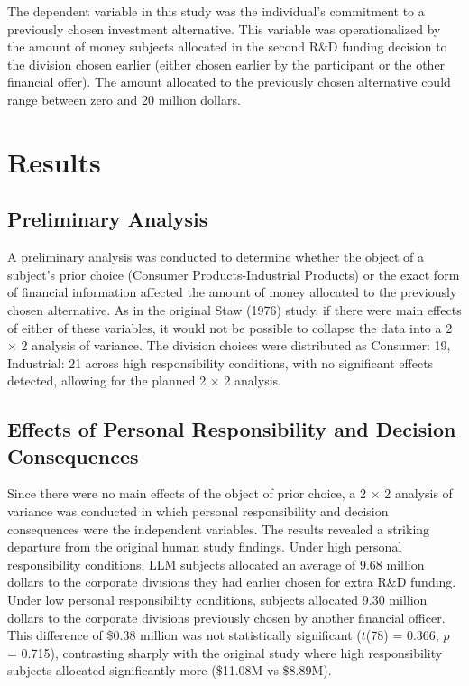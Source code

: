 \documentclass{article}
\begin{document}
The dependent variable in this study was the individual's commitment to a previously chosen investment alternative. This variable was operationalized by the amount of money subjects allocated in the second R\&D funding decision to the division chosen earlier (either chosen earlier by the participant or the other financial offer). The amount allocated to the previously chosen alternative could range between zero and 20 million dollars.

\newpage

\section{Results}

\subsection{Preliminary Analysis}

A preliminary analysis was conducted to determine whether the object of a subject's prior choice (Consumer Products-Industrial Products) or the exact form of financial information affected the amount of money allocated to the previously chosen alternative. As in the original Staw (1976) study, if there were main effects of either of these variables, it would not be possible to collapse the data into a 2 $\times$ 2 analysis of variance. The division choices were distributed as Consumer: 19, Industrial: 21 across high responsibility conditions, with no significant effects detected, allowing for the planned 2 $\times$ 2 analysis.

\subsection{Effects of Personal Responsibility and Decision Consequences}

Since there were no main effects of the object of prior choice, a 2 $\times$ 2 analysis of variance was conducted in which personal responsibility and decision consequences were the independent variables. The results revealed a striking departure from the original human study findings. Under high personal responsibility conditions, LLM subjects allocated an average of 9.68 million dollars to the corporate divisions they had earlier chosen for extra R\&D funding. Under low personal responsibility conditions, subjects allocated 9.30 million dollars to the corporate divisions previously chosen by another financial officer. This difference of \$0.38 million was not statistically significant ($t$(78) = 0.366, $p$ = 0.715), contrasting sharply with the original study where high responsibility subjects allocated significantly more (\$11.08M vs \$8.89M).
\end{document}

